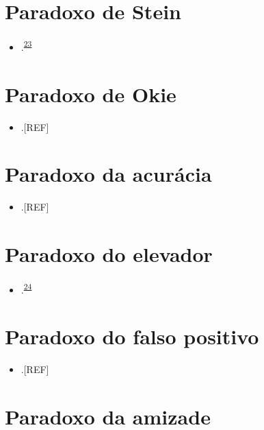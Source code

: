 \documentclass[
  a4paper,
]{book}
\providecommand{\tightlist}{%
  \setlength{\itemsep}{0pt}\setlength{\parskip}{0pt}}
\begin{document}
\hypertarget{stein}{%
\section{Paradoxo de Stein}\label{stein}}

\begin{itemize}
\tightlist
\item
  .\textsuperscript{\protect\hyperlink{ref-stein1956}{23}}
\end{itemize}

\hypertarget{okie}{%
\section{Paradoxo de Okie}\label{okie}}

\begin{itemize}
\tightlist
\item
  .{[}REF{]}
\end{itemize}

\hypertarget{acuracia}{%
\section{Paradoxo da acurácia}\label{acuracia}}

\begin{itemize}
\tightlist
\item
  .{[}REF{]}
\end{itemize}

\hypertarget{elevador}{%
\section{Paradoxo do elevador}\label{elevador}}

\begin{itemize}
\tightlist
\item
  .\textsuperscript{\protect\hyperlink{ref-de1996}{24}}
\end{itemize}

\hypertarget{falso-positivo}{%
\section{Paradoxo do falso positivo}\label{falso-positivo}}

\begin{itemize}
\tightlist
\item
  .{[}REF{]}
\end{itemize}

\hypertarget{amizade}{%
\section{Paradoxo da amizade}\label{amizade}}
\end{document}
